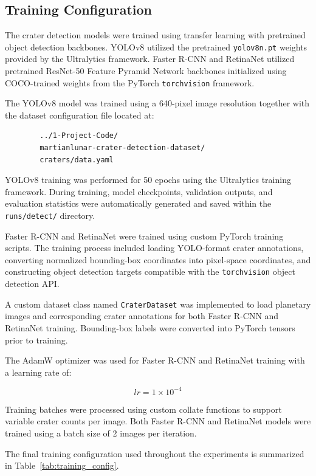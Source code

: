 \documentclass[conference]{IEEEtran}
\begin{document}
	\subsection{Training Configuration}
	
	The crater detection models were trained using transfer learning with pretrained object detection backbones. YOLOv8 utilized the pretrained \texttt{yolov8n.pt} weights provided by the Ultralytics framework. Faster R-CNN and RetinaNet utilized pretrained ResNet-50 Feature Pyramid Network backbones initialized using COCO-trained weights from the PyTorch \texttt{torchvision} framework.
	
	The YOLOv8 model was trained using a 640-pixel image resolution together with the dataset configuration file located at:
	
	\begin{verbatim}
		../1-Project-Code/
		martianlunar-crater-detection-dataset/
		craters/data.yaml
	\end{verbatim}
	
	YOLOv8 training was performed for 50 epochs using the Ultralytics training framework. During training, model checkpoints, validation outputs, and evaluation statistics were automatically generated and saved within the \texttt{runs/detect/} directory.
	
	Faster R-CNN and RetinaNet were trained using custom PyTorch training scripts. The training process included loading YOLO-format crater annotations, converting normalized bounding-box coordinates into pixel-space coordinates, and constructing object detection targets compatible with the \texttt{torchvision} object detection API.
	
	A custom dataset class named \texttt{CraterDataset} was implemented to load planetary images and corresponding crater annotations for both Faster R-CNN and RetinaNet training. Bounding-box labels were converted into PyTorch tensors prior to training.
	
	The AdamW optimizer was used for Faster R-CNN and RetinaNet training with a learning rate of:
	
	\begin{equation}
		lr = 1 \times 10^{-4}
	\end{equation}
	
	Training batches were processed using custom collate functions to support variable crater counts per image. Both Faster R-CNN and RetinaNet models were trained using a batch size of 2 images per iteration.
	
	The final training configuration used throughout the experiments is summarized in Table~\ref{tab:training_config}.
	
\end{document}
